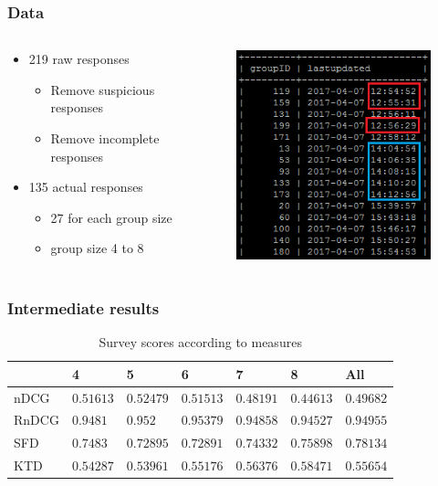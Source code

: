 \begin{frame}
\frametitle{Data}
\begin{columns}
	\begin{column}{0.5\textwidth}
		\begin{itemize}
			\item 219 raw responses
			\begin{itemize}
				\item Remove suspicious responses
				\item Remove incomplete responses
			\end{itemize}
			\item 135 actual responses
			\begin{itemize}
				\item 27 for each group size
				\item group size 4 to 8
			\end{itemize}
		\end{itemize}
	\end{column}
	\begin{column}{0.5\textwidth}
		\begin{figure}
			\centering
			\includegraphics[scale=.5]{graphics/survey_lastupdated.png}
		\end{figure}
	\end{column}
\end{columns}
\end{frame}

\begin{frame}
\frametitle{Intermediate results}
\begin{table}[H]
	\centering
	\begin{tabular}{|l|llllll|} \hline
		& 4 & 5 & 6 & 7 & 8 & All \\ \hline
		nDCG	& $0.51613$	& $0.52479$	& $0.51513$	& $0.48191$ & $0.44613$ & $0.49682$ \\
		RnDCG	& $0.9481$	& $0.952$	& $0.95379$	& $0.94858$ & $0.94527$ & $0.94955$ \\
		SFD	& $0.7483$	& $0.72895$	& $0.72891$	& $0.74332$ & $0.75898$ & $0.78134$ \\
		KTD	& $0.54287$	& $0.53961$	& $0.55176$	& $0.56376$ & $0.58471$ & $0.55654$ \\ \hline
	\end{tabular}
	\caption{Survey scores according to measures}
\end{table}
\end{frame}

